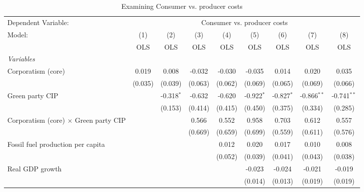 
\begin{table}[htbp]
   \caption{Examining Consumer vs. producer costs}
   \centering
   \begin{tabular}{lcccccccc}
      \toprule
      Dependent Variable: & \multicolumn{8}{c}{Consumer vs. producer costs}\\
      Model:                                       & (1)     & (2)          & (3)     & (4)     & (5)          & (6)          & (7)           & (8)\\  
                                                   &  OLS    & OLS          & OLS     & OLS     & OLS          & OLS          & OLS           & OLS\\  
      \midrule
      \emph{Variables}\\
      Corporatism (core)                           & 0.019   & 0.008        & -0.032  & -0.030  & -0.035       & 0.014        & 0.020         & 0.035\\   
                                                   & (0.035) & (0.039)      & (0.063) & (0.062) & (0.069)      & (0.065)      & (0.069)       & (0.066)\\   
      Green party CIP                              &         & -0.318$^{*}$ & -0.632  & -0.620  & -0.922$^{*}$ & -0.827$^{*}$ & -0.866$^{**}$ & -0.741$^{**}$\\   
                                                   &         & (0.153)      & (0.414) & (0.415) & (0.450)      & (0.375)      & (0.334)       & (0.285)\\   
      Corporatism (core) $\times$ Green party CIP  &         &              & 0.566   & 0.552   & 0.958        & 0.703        & 0.612         & 0.557\\   
                                                   &         &              & (0.669) & (0.659) & (0.699)      & (0.559)      & (0.611)       & (0.576)\\   
      Fossil fuel production per capita            &         &              &         & 0.012   & 0.020        & 0.017        & 0.010         & 0.008\\   
                                                   &         &              &         & (0.052) & (0.039)      & (0.041)      & (0.043)       & (0.038)\\   
      Real GDP growth                              &         &              &         &         & -0.023       & -0.024       & -0.021        & -0.019\\   
                                                   &         &              &         &         & (0.014)      & (0.013)      & (0.019)       & (0.019)\\   

\end{tabular}
\end{table}
